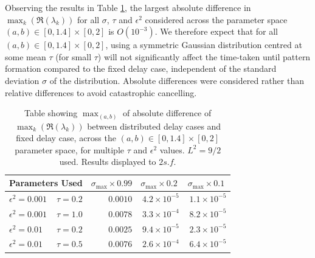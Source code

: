 Observing the results in Table \ref{tab:tab1}, the largest absolute difference in $\max_k(\Re(\lambda_k))$ for all $\sigma$, $\tau$ and $\epsilon^2$ considered across the parameter space $(a,b)\in[0,1.4]\times[0,2]$ is $O(10^{-3})$. We therefore expect that for all $(a,b)\in[0,1.4]\times[0,2]$,
using a symmetric Gaussian distribution centred at some mean $\tau$ (for small $\tau$) will not significantly affect the time-taken until pattern formation compared to the fixed delay case, independent of the standard deviation $\sigma$ of the distribution. Absolute differences were considered rather than relative differences to avoid catastrophic cancelling.

\begin{table}[H]
\centering
\begin{tabular}{lrrrr}
\hline
\multicolumn{2}{c}{Parameters Used}    & $\sigma_{\max}\times0.99$ & $\sigma_{\max}\times0.2\ $ & $\sigma_{\max}\times0.1\ $ \\ \hline
$\epsilon^2=0.001$ & \textbf{$\tau=0.2$} & $0.0010$                           & $4.2\times10^{-5}$                & $1.1\times10^{-5}$                \\
$\epsilon^2=0.001$ & $\tau=1.0$          & $0.0078$                           & $3.3\times10^{-4}$                & $8.2\times10^{-5}$                \\
$\epsilon^2=0.01$  & \textbf{$\tau=0.2$} & $0.0025$                           & $9.4\times10^{-5}$                & $2.3\times10^{-5}$                \\
$\epsilon^2=0.01$  & \textbf{$\tau=0.5$} & \textbf{$0.0076$}                  & $2.6\times10^{-4}$                & $6.4\times10^{-5}$               \\ \hline
\end{tabular}
\caption{Table showing $\max_{(a,b)}$ of absolute difference of $\max_k(\Re(\lambda_k))$ between distributed delay cases and fixed delay case, across the $(a,b)\in[0,1.4]\times[0,2]$ parameter space, for multiple $\tau$ and $\epsilon^2$ values. $L^2=9/2$ used. Results displayed to $2 s.f.$}
\label{tab:tab1}
\end{table}

